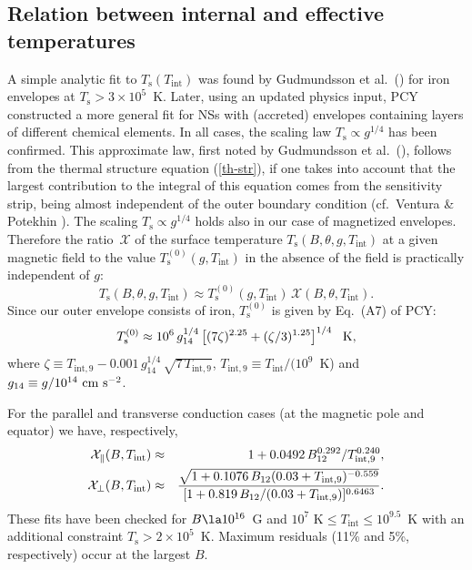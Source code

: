 \documentclass{aa}
\begin{document}
\subsection{Relation between internal and effective temperatures}
%
A simple analytic fit to $T_\mathrm{s}(T_\mathrm{int})$
was found by Gudmundsson et al.\ (\cite{gpe83})
for iron envelopes at $T_\mathrm{s} > 3 \times 10^5$~K.
Later, using an updated physics input, PCY constructed
a more general fit for NSs with (accreted) envelopes
containing layers of different chemical elements. In all cases,
the scaling law $T_\mathrm{s} \propto g^{1/4}$ has been confirmed.
This approximate law,
first noted by Gudmundsson et al.\ (\cite{gpe83}),
follows from the thermal structure equation (\ref{th-str}),
if one takes into account that the largest contribution to
the integral of this equation comes from the
sensitivity strip, 
being almost independent of the outer boundary
condition (cf.\ Ventura \& Potekhin \cite{elounda}).
The scaling $T_\mathrm{s} \propto g^{1/4}$
holds also in our case of magnetized envelopes.
Therefore the ratio $\,\mathcal{X}$ of the surface temperature
$T_\mathrm{s}(B,\theta,g,T_\mathrm{int})$ at a given magnetic
field to the value $T_\mathrm{s}^{(0)}(g,T_\mathrm{int})$
in the absence
of the field is practically independent of $g$:
%
\begin{equation}
   T_\mathrm{s}(B,\theta,g,T_\mathrm{int})\approx
   T_\mathrm{s}^{(0)}(g,T_\mathrm{int}) \,\mathcal{X}(B,\theta,T_\mathrm{int}).
 \label{X}
\end{equation}
%
Since our outer envelope consists of iron,
$T_\mathrm{s}^{(0)}$ is given by Eq.\ (A7) of PCY:
%
\begin{equation}
   T_\mathrm{s}^{(0)} \approx  10^6 \,
   g_{14}^{1/4}\left[(7\zeta)^{2.25}+(\zeta/3)^{1.25}\right]^{1/4}~~{\rm K},
\label{PCY-iron}
\end{equation}
%
where
$\zeta\equiv T_\mathrm{int,9}
-0.001\,g_{14}^{1/4}\,\sqrt{7 \, T_\mathrm{int,9}}$,
$T_\mathrm{int,9}\equiv T_\mathrm{int}/(10^9$~K)
and $g_{14}\equiv g/10^{14}{\rm~cm~s}^{-2}$.

For the parallel and transverse conduction
cases (at the magnetic pole and equator)
we have, respectively,
%
\begin{eqnarray}
  \mathcal{X}_\|(B,T_\mathrm{int}) &\approx&
           1+0.0492\,B_{12}^{0.292}/T_\mathrm{int,9}^{0.240},
\label{fit1}
\\
  \mathcal{X}_\perp(B,T_\mathrm{int}) &\approx&
          {\sqrt{1+0.1076\,B_{12} (0.03+T_\mathrm{int,9})^{-0.559}}
       \over
             [1+0.819\,B_{12} / (0.03+T_\mathrm{int,9})]^{0.6463}}.
\label{fit2}
\end{eqnarray}
%
These fits have been checked for $B \la 10^{16}$~G
and $10^7 \mbox{ K} \leq T_\mathrm{int} \leq 10^{9.5}$~K
with an additional constraint
$T_\mathrm{s}>2\times10^5$~K.
Maximum residuals (11\% and 5\%, respectively)
occur at the largest $B$.
\end{document}
